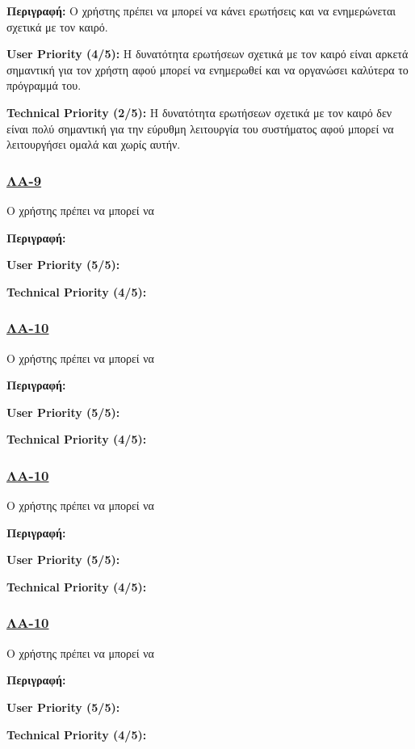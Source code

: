 \noindent\textbf{Περιγραφή:} Ο χρήστης πρέπει να μπορεί να κάνει ερωτήσεις και να ενημερώνεται σχετικά με τον καιρό.

\noindent\textbf{User Priority (4/5):} Η δυνατότητα ερωτήσεων σχετικά με τον καιρό είναι αρκετά σημαντική για τον χρήστη αφού μπορεί να ενημερωθεί και να οργανώσει καλύτερα το πρόγραμμά του.

\noindent\textbf{Technical Priority (2/5):} Η δυνατότητα ερωτήσεων σχετικά με τον καιρό δεν είναι πολύ σημαντική για την εύρυθμη λειτουργία του συστήματος αφού μπορεί να λειτουργήσει ομαλά και χωρίς αυτήν.


\subsubsection{\underline{ΛΑ-9}}
\noindent Ο χρήστης πρέπει να μπορεί να

\noindent\textbf{Περιγραφή:}

\noindent\textbf{User Priority (5/5):}

\noindent\textbf{Technical Priority (4/5):}

\subsubsection{\underline{ΛΑ-10}}
\noindent Ο χρήστης πρέπει να μπορεί να

\noindent\textbf{Περιγραφή:}

\noindent\textbf{User Priority (5/5):}

\noindent\textbf{Technical Priority (4/5):}
\subsubsection{\underline{ΛΑ-10}}
\noindent Ο χρήστης πρέπει να μπορεί να

\noindent\textbf{Περιγραφή:}

\noindent\textbf{User Priority (5/5):}

\noindent\textbf{Technical Priority (4/5):}

\subsubsection{\underline{ΛΑ-10}}
\noindent Ο χρήστης πρέπει να μπορεί να

\noindent\textbf{Περιγραφή:}

\noindent\textbf{User Priority (5/5):}

\noindent\textbf{Technical Priority (4/5):}


